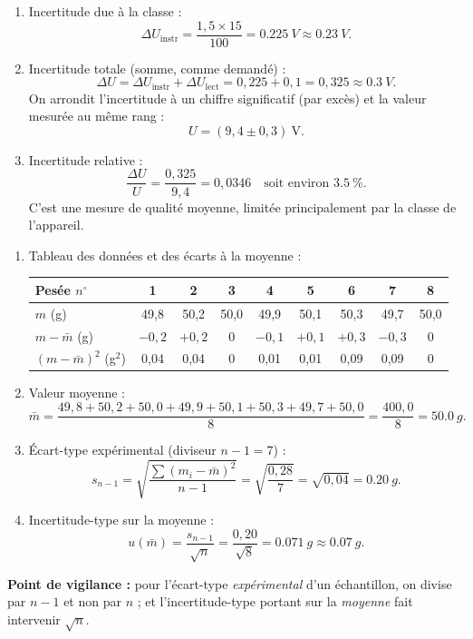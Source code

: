 \documentclass[11pt]{article}
\begin{document}
\begin{corrige}
\begin{enumerate}
\item Incertitude due à la classe :
\[ \Delta U_{\text{instr}} = \frac{1{,}5 \times 15}{100} = \SI{0,225}{V} \approx \SI{0,23}{V}. \]
\item Incertitude totale (somme, comme demandé) :
\[ \Delta U = \Delta U_{\text{instr}} + \Delta U_{\text{lect}} = 0{,}225 + 0{,}1 = 0{,}325 \approx \SI{0,3}{V}. \]
On arrondit l'incertitude à un chiffre significatif (par excès) et la valeur mesurée au même rang :
\[ \boxed{U = (9{,}4 \pm 0{,}3)~\text{V}}. \]
\item Incertitude relative :
\[ \frac{\Delta U}{U} = \frac{0{,}325}{9{,}4} = 0{,}0346 \quad \text{soit environ } \SI{3,5}{\%}. \]
C'est une mesure de qualité moyenne, limitée principalement par la classe de l'appareil.
\end{enumerate}
\end{corrige}

\begin{corrige}
\begin{enumerate}
\item Tableau des données et des écarts à la moyenne :
\begin{center}
\begin{tabular}{|l|*{8}{c|}}
\hline
Pesée $n^{\circ}$ & 1 & 2 & 3 & 4 & 5 & 6 & 7 & 8 \\
\hline
$m$ (g) & 49,8 & 50,2 & 50,0 & 49,9 & 50,1 & 50,3 & 49,7 & 50,0 \\
\hline
$m - \bar{m}$ (g) & $-0{,}2$ & $+0{,}2$ & $0$ & $-0{,}1$ & $+0{,}1$ & $+0{,}3$ & $-0{,}3$ & $0$ \\
\hline
$(m-\bar{m})^2$ (g$^2$) & 0,04 & 0,04 & 0 & 0,01 & 0,01 & 0,09 & 0,09 & 0 \\
\hline
\end{tabular}
\end{center}
\item Valeur moyenne :
\[ \bar{m} = \frac{49{,}8 + 50{,}2 + 50{,}0 + 49{,}9 + 50{,}1 + 50{,}3 + 49{,}7 + 50{,}0}{8} = \frac{400{,}0}{8} = \SI{50,0}{g}. \]
\item Écart-type expérimental (diviseur $n - 1 = 7$) :
\[ s_{n-1} = \sqrt{\frac{\sum (m_i - \bar{m})^2}{n-1}} = \sqrt{\frac{0{,}28}{7}} = \sqrt{0{,}04} = \SI{0,20}{g}. \]
\item Incertitude-type sur la moyenne :
\[ u(\bar{m}) = \frac{s_{n-1}}{\sqrt{n}} = \frac{0{,}20}{\sqrt{8}} = \SI{0,071}{g} \approx \SI{0,07}{g}. \]
\end{enumerate}
\textbf{Point de vigilance :} pour l'écart-type \emph{expérimental} d'un échantillon, on divise par $n-1$ et non par $n$ ; et l'incertitude-type portant sur la \emph{moyenne} fait intervenir $\sqrt{n}$.
\end{corrige}
\end{document}
